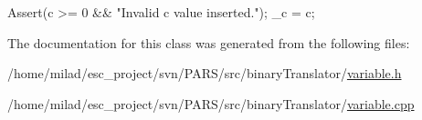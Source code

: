 \begin{DoxyCode}
                         {
        Assert(c >= 0 && "Invalid c value inserted.");
        _c = c;
}
\end{DoxyCode}


The documentation for this class was generated from the following files:\begin{DoxyCompactItemize}
\item 
/home/milad/esc\_\-project/svn/PARS/src/binaryTranslator/\hyperlink{variable_8h}{variable.h}\item 
/home/milad/esc\_\-project/svn/PARS/src/binaryTranslator/\hyperlink{variable_8cpp}{variable.cpp}\end{DoxyCompactItemize}

